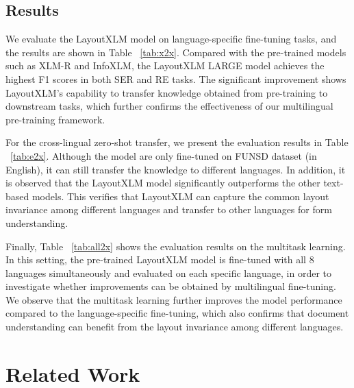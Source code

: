 \documentclass[11pt]{article}
\begin{document}
\subsection{Results}
We evaluate the LayoutXLM model on language-specific fine-tuning tasks, and the results are shown in Table ~\ref{tab:x2x}. Compared with the pre-trained models such as XLM-R and InfoXLM, the LayoutXLM LARGE model achieves the highest F1 scores in both SER and RE tasks. The significant improvement shows LayoutXLM's capability to transfer knowledge obtained from pre-training to downstream tasks, which further confirms the effectiveness of our multilingual pre-training framework.

For the cross-lingual zero-shot transfer, we present the evaluation results in Table ~\ref{tab:e2x}. Although the model are only fine-tuned on FUNSD dataset (in English), it can still transfer the knowledge to different languages. In addition, it is observed that the LayoutXLM model significantly outperforms the other text-based models. This verifies that LayoutXLM can capture the common layout invariance among different languages and transfer to other languages for form understanding.

Finally, Table ~\ref{tab:all2x} shows the evaluation results on the multitask learning. In this setting, the pre-trained LayoutXLM model is fine-tuned with all 8 languages simultaneously and evaluated on each specific language, in order to investigate whether improvements can be obtained by multilingual fine-tuning. We observe that the multitask learning further improves the model performance compared to the language-specific fine-tuning, which also confirms that document understanding can benefit from the layout invariance among different languages.




\section{Related Work}
\end{document}
